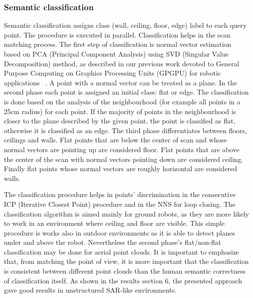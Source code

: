 \documentclass{article}
\begin{document}
\subsubsection{Semantic classification}
Semantic classification assigns class (wall, ceiling, floor, edge) label to each query point.
The procedure is executed in parallel.
Classification helps in the scan matching process.
The first step of classification is normal vector estimation based on PCA (Principal Component Analysis) using SVD (Singular Value Decomposition) method, as described in our previous work devoted to General Purpose Computing on Graphics Processing Units (GPGPU) for robotic applications ~\cite{nuechter2013e}.
A point with a normal vector can be treated as a plane.
In the second phase each point is assigned an initial class: flat or edge.
The classification is done based on the analysis of the neighbourhood (for example all points in a 25cm radius) for each point.
If the majority of points in the neighbourhood is closer to the plane described by the given point, the point is classified as flat, otherwise it is classified as an edge.
The third phase differentiates between floors, ceilings and walls.
Flat points that are below the center of scan and whose normal vectors are pointing up are considered floor.
Flat points that are above the center of the scan with normal vectors pointing down are considered ceiling. Finally flat points whose normal vectors are roughly horizontal are considered walls.

The classification procedure helps in points' discrimination in the consecutive ICP (Iterative Closest Point) procedure and in the NNS for loop closing.
The classification algorithm is aimed mainly for ground robots, as they are more likely to work in an environment where ceiling and floor are visible.
This simple procedure is works also in outdoor environments as it is able to detect planes under and above the robot.
Nevertheless the second phase's flat/non-flat classification may be done for aerial point clouds. It is important to emphasize that, from matching the point of view, it is more important that the classification is consistent between different point clouds than the human semantic correctness of classification itself.
As shown in the results section 6, the presented approach gave good results in unstructured SAR-like environments.
\end{document}
